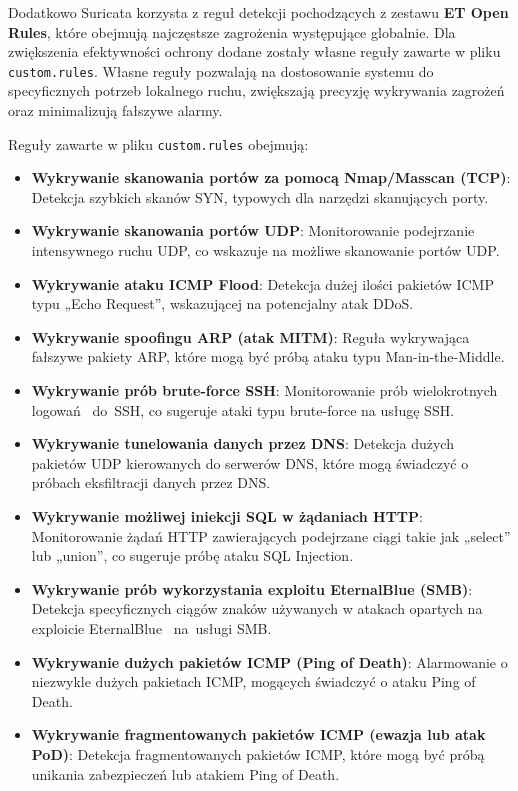 \documentclass[
    left=2.5cm,         %
    right=2.5cm,        %
    top=2.5cm,          %
    bottom=3cm,         %
    bindingoffset=6mm,  %
    nohyphenation=true %
]{eiti/eiti-thesis} %
\begin{document}
Dodatkowo Suricata korzysta z reguł detekcji pochodzących z zestawu \textbf{ET Open Rules}, które obejmują najczęstsze zagrożenia występujące globalnie. 
Dla zwiększenia efektywności ochrony  dodane zostały własne reguły zawarte w pliku \texttt{custom.rules}\cite{custom-rules-github}. Własne reguły pozwalają 
na dostosowanie systemu do specyficznych potrzeb lokalnego ruchu, zwiększają precyzję wykrywania zagrożeń oraz minimalizują fałszywe alarmy.

\newpage
Reguły zawarte w pliku \texttt{custom.rules} obejmują:

\begin{itemize}
\item \textbf{Wykrywanie skanowania portów za pomocą Nmap/Masscan (TCP)}: Detekcja szybkich skanów SYN, typowych dla narzędzi skanujących porty.
\item \textbf{Wykrywanie skanowania portów UDP}: Monitorowanie podejrzanie intensywnego ruchu UDP, co wskazuje na możliwe skanowanie portów UDP.

\item \textbf{Wykrywanie ataku ICMP Flood}: Detekcja dużej ilości pakietów ICMP typu „Echo Request”, wskazującej na potencjalny atak DDoS.

\item \textbf{Wykrywanie spoofingu ARP (atak MITM)}: Reguła wykrywająca fałszywe pakiety ARP, które mogą być próbą ataku typu Man-in-the-Middle.

\item \textbf{Wykrywanie prób brute-force SSH}: Monitorowanie prób wielokrotnych logowań ~do~SSH, co sugeruje ataki typu brute-force na usługę SSH.

\item \textbf{Wykrywanie tunelowania danych przez DNS}: Detekcja dużych pakietów UDP kierowanych do serwerów DNS, które mogą świadczyć o próbach eksfiltracji danych przez DNS.

\item \textbf{Wykrywanie możliwej iniekcji SQL w żądaniach HTTP}: Monitorowanie żądań HTTP zawierających podejrzane ciągi takie jak „select” lub „union”, co sugeruje próbę ataku SQL Injection.

\item \textbf{Wykrywanie prób wykorzystania exploitu EternalBlue (SMB)}: Detekcja specyficznych ciągów znaków używanych w atakach opartych na exploicie EternalBlue 
~na~usługi SMB.

\item \textbf{Wykrywanie dużych pakietów ICMP (Ping of Death)}: Alarmowanie o niezwykle dużych pakietach ICMP, mogących świadczyć o ataku Ping of Death.

\item \textbf{Wykrywanie fragmentowanych pakietów ICMP (ewazja lub atak PoD)}: Detekcja fragmentowanych pakietów ICMP, które mogą być próbą unikania zabezpieczeń 
lub atakiem Ping of Death.
\end{itemize}
\end{document}
